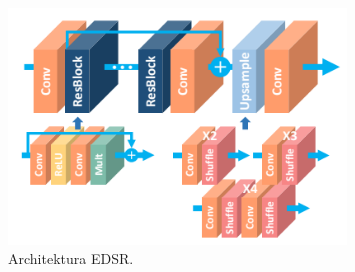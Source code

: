 \documentclass[a4paper,11pt, notitlepage ]{article}
\begin{document}
 \begin{figure}[h!]
 	\centering
 	\includegraphics[width=0.8\textwidth]{EDSR/EDSR_2.png}
 	\caption{Architektura EDSR.}
 \end{figure}

\newpage
\end{document}
